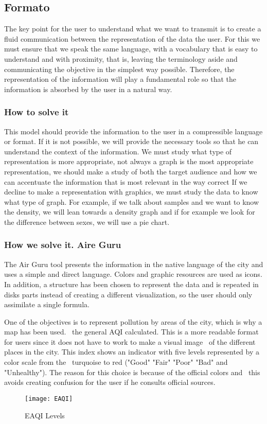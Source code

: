 \subsection{Formato}
The key point for the user to understand what we want to transmit is to create a fluid communication between the representation
of the data the user. For this we must ensure that we speak the same language, with a vocabulary that is easy to understand and
with proximity, that is, leaving the terminology aside and communicating the objective in the simplest way possible.
Therefore, the representation of the information will play a fundamental role so that the
information is absorbed by the user in a natural way.


\subsubsection{How to solve it} 
This model should provide the information to the user in a compressible language or format. If it is not possible, we will provide the
necessary tools so that he can understand the context of the information.
We must study what type of representation is more appropriate, not always a graph is the most appropriate representation, we should make a
study of both the target audience and how we can accentuate the information that is most relevant in the way
correct
If we decline to make a representation with graphics, we must study the data to know what type of graph. For example,
if we talk about samples and we want to know the density, we will lean towards a density graph and if for example we look for the difference
between sexes, we will use a pie chart.

\subsubsection{How we solve it. Aire Guru} 
The Air Guru tool presents the information in the native language of the city and uses a simple and direct language.
Colors and graphic resources are used as icons. In addition, a structure has been chosen to represent the data and is repeated in disks
parts instead of creating a different visualization, so the user should only assimilate a single formula.

One of the objectives is to represent pollution by areas of the city, which is why a map has been used.
 the general AQI calculated. This is a more readable format for users since it does not have to work to make a visual image
 of the different places in the city. This index shows an indicator with five levels represented by a color scale from the
 turquoise to red ("Good" "Fair" "Poor" "Bad" and "Unhealthy"). The reason for this choice is because of the official colors and
 this avoids creating confusion for the user if he consults official sources.
 \newpage
 \begin{figure}[ht]
    \centering
    \texttt{[image: EAQI]}
    \caption{EAQI Levels}
\end{figure}

